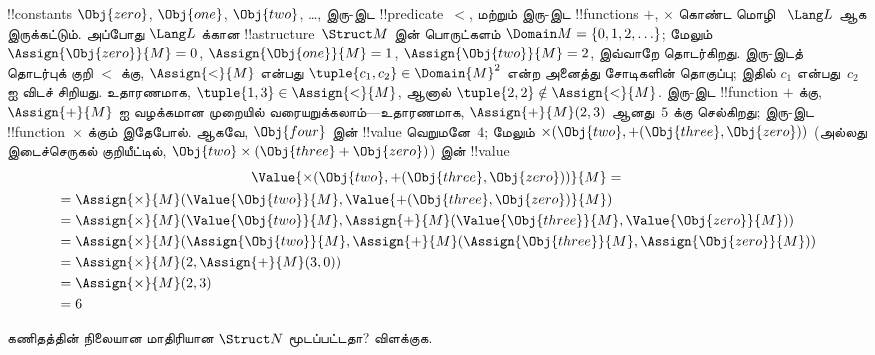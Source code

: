 \documentclass[../../../include/open-logic-section]{subfiles}
\begin{document}
\begin{ex}
!!{constant}s $\Obj{zero}$, $\Obj{one}$, $\Obj{two}$, \dots, இரு-இட
!!{predicate}~$<$, மற்றும் இரு-இட !!{function}s $+$, $\times$ கொண்ட மொழி
~$\Lang L$ ஆக இருக்கட்டும். அப்போது $\Lang L$ க்கான !!a{structure}~$\Struct
M$ இன் பொருட்களம் $\Domain M = \{0, 1, 2, \ldots\}$; மேலும்
$\Assign{\Obj{zero}}{M} = 0$, $\Assign{\Obj{one}}{M} = 1$,
$\Assign{\Obj{two}}{M} = 2$, இவ்வாறே தொடர்கிறது. இரு-இடத் தொடர்புக் குறி
$<$ க்கு, $\Assign{<}{M}$ என்பது $\tuple{c_1, c_2} \in \Domain{M}^2$ என்ற
அனைத்து சோடிகளின் தொகுப்பு; இதில் $c_1$ என்பது~$c_2$ ஐ விடச் சிறியது.
உதாரணமாக,
$\tuple{1, 3} \in \Assign{<}{M}$, ஆனால்
$\tuple{2, 2} \notin \Assign{<}{M}$. இரு-இட !!{function} $+$ க்கு,
$\Assign{+}{M}$ ஐ வழக்கமான முறையில் வரையறுக்கலாம்---உதாரணமாக,
$\Assign{+}{M}(2,3)$ ஆனது~$5$ க்கு செல்கிறது; இரு-இட !!{function}~$\times$
க்கும் இதேபோல். ஆகவே, $\Obj{four}$ இன் !!{value} வெறுமனே~$4$; மேலும்
$\times(\Obj{two}, + (\Obj{three},\Obj{zero}))$ (அல்லது இடைச்செருகல்
குறியீட்டில், $\Obj{two} \times (\Obj{three} + \Obj{zero})$) இன் !!{value}
\begin{multline*}
\Value{\times(\Obj{two}, +(\Obj{three},\Obj{zero}))}{M} =\\
\begin{aligned}
& =\Assign{\times}{M}(\Value{\Obj{two}}{M}, \Value{+(\Obj{three}, \Obj{zero})}{M})\\
& = \Assign{\times}{M}(\Value{\Obj{two}}{M}, \Assign{+}{M}(\Value{\Obj{three}}{M},
\Value{\Obj{zero}}{M})) \\
& = \Assign{\times}{M}(\Assign{\Obj{two}}{M}, \Assign{+}{M}(\Assign{\Obj{three}}{M},
\Assign{\Obj{zero}}{M})) \\
& = \Assign{\times}{M}(2, \Assign{+}{M}(3, 0)) \\
& = \Assign{\times}{M}(2, 3) \\
& = 6
\end{aligned}
\end{multline*}
\end{ex}

\begin{prob}
கணிதத்தின் நிலையான மாதிரியான $\Struct N$ மூடப்பட்டதா? விளக்குக.
\end{prob}
\end{document}
